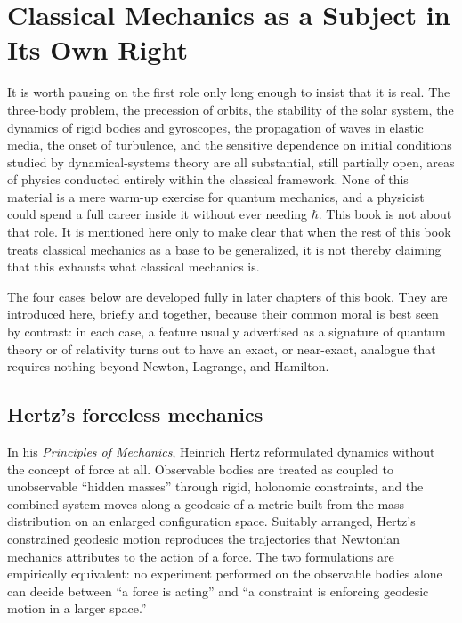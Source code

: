 
\section{Classical Mechanics as a Subject in Its Own Right}
\label{cm:st}

It is worth pausing on the first role only long enough to insist that it is real.
The three-body problem, the precession of orbits, the stability of the solar
system, the dynamics of rigid bodies and gyroscopes, the propagation of waves in
elastic media, the onset of turbulence, and the sensitive dependence on initial
conditions studied by dynamical-systems theory are all substantial, still
partially open, areas of physics conducted entirely within the classical
framework. None of this material is a mere warm-up exercise for quantum mechanics,
and a physicist could spend a full career inside it without ever needing $\hbar$.
This book is not about that role. It is mentioned here only to make clear that
when the rest of this book treats classical mechanics as a base to be generalized,
it is not thereby claiming that this exhausts what classical mechanics is.

The four cases below are developed fully in later chapters of this book. They
are introduced here, briefly and together, because their common moral is best
seen by contrast: in each case, a feature usually advertised as a signature of
quantum theory or of relativity turns out to have an exact, or near-exact,
analogue that requires nothing beyond Newton, Lagrange, and Hamilton.

\subsection{Hertz's forceless mechanics }

In his \emph{Principles of Mechanics}, Heinrich Hertz reformulated dynamics
without the concept of force at all. Observable bodies are treated as coupled to
unobservable ``hidden masses'' through rigid, holonomic constraints, and the
combined system moves along a geodesic of a metric built from the mass
distribution on an enlarged configuration space. Suitably arranged, Hertz's
constrained geodesic motion reproduces the trajectories that Newtonian mechanics
attributes to the action of a force. The two formulations are empirically
equivalent: no experiment performed on the observable bodies alone can decide
between ``a force is acting'' and ``a constraint is enforcing geodesic motion in
a larger space.''

